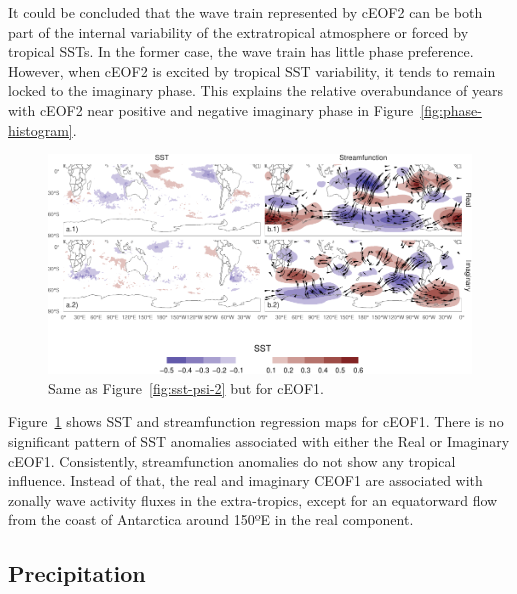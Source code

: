 \documentclass[smallextended]{svjour3}       %
\begin{document}
It could be concluded that the wave train represented by cEOF2 can be both part of the internal variability of the extratropical atmosphere or forced by tropical SSTs. In the former case, the wave train has little phase preference. However, when cEOF2 is excited by tropical SST variability, it tends to remain locked to the imaginary phase. This explains the relative overabundance of years with cEOF2 near positive and negative imaginary phase in Figure~\ref{fig:phase-histogram}.



\begin{figure}
\includegraphics{../figures/sst-psi-1-1} \caption{Same as Figure~\ref{fig:sst-psi-2} but for cEOF1.}\label{fig:sst-psi-1}
\end{figure}

Figure~\ref{fig:sst-psi-1} shows SST and streamfunction regression maps for cEOF1. There is no significant pattern of SST anomalies associated with either the Real or Imaginary cEOF1. Consistently, streamfunction anomalies do not show any tropical influence. Instead of that, the real and imaginary CEOF1 are associated with zonally wave activity fluxes in the extra-tropics, except for an equatorward flow from the coast of Antarctica around 150ºE in the real component.

\hypertarget{precipitation}{%
\subsection{Precipitation}\label{precipitation}}
\end{document}
